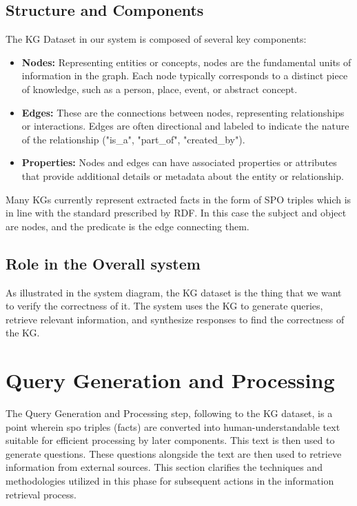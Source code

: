 \subsection{Structure and Components}\label{subsec:structure-and-components}
The \ac{KG} Dataset in our system is composed of several key components:
\begin{itemize}
    \item \textbf{Nodes:} Representing entities or concepts, nodes are the fundamental units of information in the graph. Each node typically corresponds to a distinct piece of knowledge, such as a person, place, event, or abstract concept.
    \item \textbf{Edges:} These are the connections between nodes, representing relationships or interactions. Edges are often directional and labeled to indicate the nature of the relationship (\eg "is\_a", "part\_of", "created\_by").
    \item \textbf{Properties:} Nodes and edges can have associated properties or attributes that provide additional details or metadata about the entity or relationship.
\end{itemize}
Many \acp{KG} currently represent extracted facts in the form of \ac{SPO} triples which is in line with the standard prescribed by \ac{RDF}.
In this case the subject and object are nodes, and the predicate is the edge connecting them.

\subsection{Role in the Overall system}\label{subsec:role-in-the-overall-system}
As illustrated in the system diagram, the \ac{KG} dataset is the thing that we want to verify the correctness of it.
The system uses the \ac{KG} to generate queries, retrieve relevant information, and synthesize responses to find the correctness of the \ac{KG}.

\section{Query Generation and Processing}\label{sec:query-generation-and-processing}
The Query Generation and Processing step, following to the \ac{KG} dataset, is a point wherein spo triples (\ie facts) are converted into human-understandable text suitable for efficient processing by later components.
This text is then used to generate questions.
These questions alongside the text are then used to retrieve information from external sources.
This section clarifies the techniques and methodologies utilized in this phase for subsequent actions in the information retrieval process.

